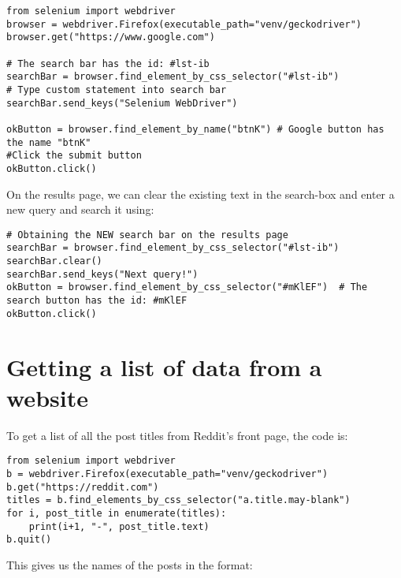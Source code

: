 \vspace{-15pt}
\begin{verbatim}
from selenium import webdriver
browser = webdriver.Firefox(executable_path="venv/geckodriver")
browser.get("https://www.google.com")

# The search bar has the id: #lst-ib
searchBar = browser.find_element_by_css_selector("#lst-ib")
# Type custom statement into search bar
searchBar.send_keys("Selenium WebDriver")

okButton = browser.find_element_by_name("btnK") # Google button has the name "btnK"
#Click the submit button
okButton.click()
\end{verbatim}
\vspace{-10pt}	

\noindent
On the results page, we can clear the existing text in the search-box and enter a new query and search it using:

\vspace{-15pt}
\begin{verbatim}
# Obtaining the NEW search bar on the results page
searchBar = browser.find_element_by_css_selector("#lst-ib")
searchBar.clear()
searchBar.send_keys("Next query!")
okButton = browser.find_element_by_css_selector("#mKlEF")  # The search button has the id: #mKlEF
okButton.click()
\end{verbatim}
\vspace{-10pt}	

\section{Getting a list of data from a website}
To get a list of all the post titles from Reddit's front page, the code is:

\vspace{-15pt}
\begin{verbatim}
from selenium import webdriver
b = webdriver.Firefox(executable_path="venv/geckodriver")
b.get("https://reddit.com")
titles = b.find_elements_by_css_selector("a.title.may-blank")
for i, post_title in enumerate(titles):
	print(i+1, "-", post_title.text)
b.quit()
\end{verbatim}
\vspace{-10pt}	

\noindent
This gives us the names of the posts in the format:

